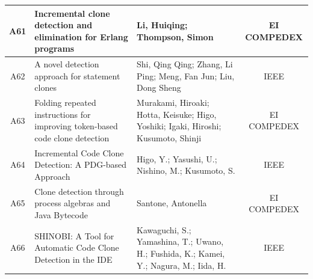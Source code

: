 \begin{table}[ht]
{\begin{tabular}{cllc}
			
			A61  & Incremental clone detection and elimination for Erlang programs                                                                                & Li, Huiqing; Thompson, Simon                                                                                               & EI COMPEDEX                                               \\\hline 
			A62  & A novel detection approach for statement clones                                                                                                & Shi, Qing Qing; Zhang, Li Ping; Meng, Fan Jun; Liu, Dong Sheng                                                             & IEEE                                                      \\\hline 
			A63  & Folding repeated instructions for improving token-based code clone detection                                                                   & Murakami, Hiroaki; Hotta, Keisuke; Higo, Yoshiki; Igaki, Hiroshi; Kusumoto, Shinji                                         & EI COMPEDEX                                               \\\hline 
			A64  & Incremental Code Clone Detection: A PDG-based Approach                                                                                         & Higo, Y.; Yasushi, U.; Nishino, M.; Kusumoto, S.                                                                           & IEEE                                                      \\\hline 
			A65  & Clone detection through process algebras and Java Bytecode                                                                                     & Santone, Antonella                                                                                                         & EI COMPEDEX                                               \\\hline 
			A66  & SHINOBI: A Tool for Automatic Code Clone Detection in the IDE                                                                                  & Kawaguchi, S.; Yamashina, T.; Uwano, H.; Fushida, K.; Kamei, Y.; Nagura, M.; Iida, H.                                      & IEEE                                                      \\\hline 
		\end{tabular}
	}
\end{table}


